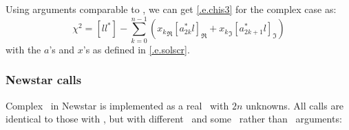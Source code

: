 Using arguments comparable to , we can get
\eqref{.e.chis3} for the complex case as:
\begin{equation}
	\chi^{2} = [ll^{*}] -
\sum_{k=0}^{n-1} \left( {x_{k}}_{\Re}{\left[ a_{2k}^{*}l \right]}_{\Re} +
{x_{k}}_{\Im}{\left[ a_{2k+1}^{*}l \right]}_{\Im}  \right)
\label{.e.chis4}
\end{equation}
with the $a$'s and $x$'s as defined in \eqref{.e.solscr}.

\subsubsection{Newstar calls}
\label{.ss.ccalls}

Complex \LSQ\ in Newstar is implemented as a real \LSQ\ with $2n$
unknowns. All calls are identical to those with
, but with different \Type\ and some \Complex\
rather than
\Real\ arguments:
